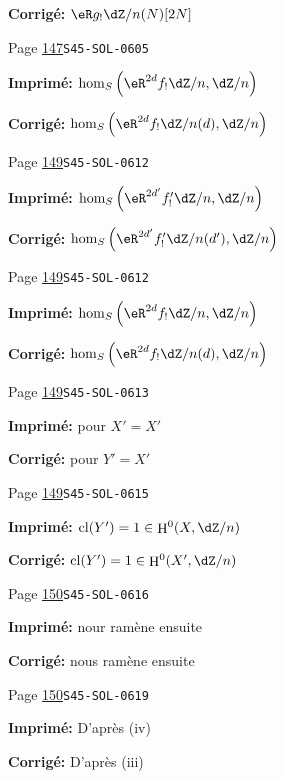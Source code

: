 \documentclass[oneside]{book}
\DeclareMathOperator{\cl}{cl}
\DeclareMathOperator{\h}{H}
\theoremstyle{sga-source}
\theoremstyle{sga-source-dash}
\theoremstyle{sga-source-dotdash}
\theoremstyle{sga-source-number-note-dash}
\theoremstyle{sga-source-note-number-dotdash}
\theoremstyle{sga-source-example-dotdash}
\theoremstyle{sga-source-inline-number}
\theoremstyle{sga-source-bare-number}
\theoremstyle{sga-source}
\begin{document}
\begin{description}
\par\noindent\textbf{Corrigé:} \(\eR g_!\dZ/n(N)[2 N]\)
\smallskip
\item[\hypertarget{apparatus:FR-0111}{111}] Page \hyperlink{printpage:fr:147}{147}\quad\texttt{S45-SOL-0605}
\par\noindent\textbf{Imprimé:} \(\hom_S\left(\eR^{2 d} f_!\dZ/n,\dZ/n\right)\)
\par\noindent\textbf{Corrigé:} \(\hom_S\left(\eR^{2 d} f_!\dZ/n(d),\dZ/n\right)\)
\smallskip
\item[\hypertarget{apparatus:FR-0112}{112}] Page \hyperlink{printpage:fr:149}{149}\quad\texttt{S45-SOL-0612}
\par\noindent\textbf{Imprimé:} \(\hom_S\left(\eR^{2 d'} f_!' \dZ/n,\dZ/n\right)\)
\par\noindent\textbf{Corrigé:} \(\hom_S\left(\eR^{2 d'} f_!' \dZ/n(d'),\dZ/n\right)\)
\smallskip
\item[\hypertarget{apparatus:FR-0113}{113}] Page \hyperlink{printpage:fr:149}{149}\quad\texttt{S45-SOL-0612}
\par\noindent\textbf{Imprimé:} \(\hom_S\left(\eR^{2 d}f_!\dZ/n,\dZ/n\right)\)
\par\noindent\textbf{Corrigé:} \(\hom_S\left(\eR^{2 d}f_!\dZ/n(d),\dZ/n\right)\)
\smallskip
\item[\hypertarget{apparatus:FR-0114}{114}] Page \hyperlink{printpage:fr:149}{149}\quad\texttt{S45-SOL-0613}
\par\noindent\textbf{Imprimé:} pour $X'=X'$
\par\noindent\textbf{Corrigé:} pour $Y'=X'$
\smallskip
\item[\hypertarget{apparatus:FR-0115}{115}] Page \hyperlink{printpage:fr:149}{149}\quad\texttt{S45-SOL-0615}
\par\noindent\textbf{Imprimé:} \(\cl(Y')=1\in \h^0(X,\dZ/n)\)
\par\noindent\textbf{Corrigé:} \(\cl(Y')=1\in \h^0(X',\dZ/n)\)
\smallskip
\item[\hypertarget{apparatus:FR-0116}{116}] Page \hyperlink{printpage:fr:150}{150}\quad\texttt{S45-SOL-0616}
\par\noindent\textbf{Imprimé:} nour ramène ensuite
\par\noindent\textbf{Corrigé:} nous ramène ensuite
\smallskip
\item[\hypertarget{apparatus:FR-0117}{117}] Page \hyperlink{printpage:fr:150}{150}\quad\texttt{S45-SOL-0619}
\par\noindent\textbf{Imprimé:} D'après (iv)
\par\noindent\textbf{Corrigé:} D'après (iii)

\end{description}
\end{document}

